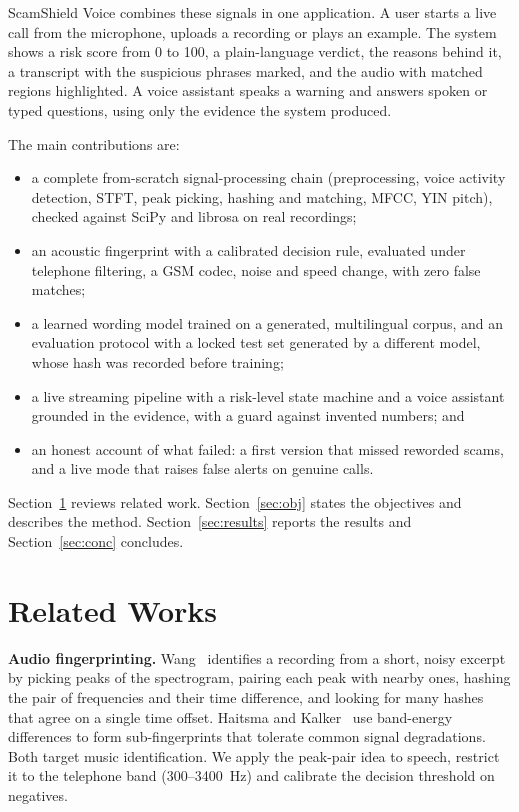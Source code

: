 \documentclass[letterpaper,12pt]{article}
\begin{document}
ScamShield Voice combines these signals in one application. A user starts a live call from the microphone, uploads a recording or plays an example. The system shows a risk score from 0 to 100, a plain-language verdict, the reasons behind it, a transcript with the suspicious phrases marked, and the audio with matched regions highlighted. A voice assistant speaks a warning and answers spoken or typed questions, using only the evidence the system produced.

The main contributions are:
\begin{itemize}
    \item a complete from-scratch signal-processing chain (preprocessing, voice activity detection, STFT, peak picking, hashing and matching, MFCC, YIN pitch), checked against SciPy and librosa on real recordings;
    \item an acoustic fingerprint with a calibrated decision rule, evaluated under telephone filtering, a GSM codec, noise and speed change, with zero false matches;
    \item a learned wording model trained on a generated, multilingual corpus, and an evaluation protocol with a locked test set generated by a different model, whose hash was recorded before training;
    \item a live streaming pipeline with a risk-level state machine and a voice assistant grounded in the evidence, with a guard against invented numbers; and
    \item an honest account of what failed: a first version that missed reworded scams, and a live mode that raises false alerts on genuine calls.
\end{itemize}
Section~\ref{sec:related} reviews related work. Section~\ref{sec:obj} states the objectives and describes the method. Section~\ref{sec:results} reports the results and Section~\ref{sec:conc} concludes.

\section{Related Works}\label{sec:related}
\textbf{Audio fingerprinting.} Wang~\cite{wang2003shazam} identifies a recording from a short, noisy excerpt by picking peaks of the spectrogram, pairing each peak with nearby ones, hashing the pair of frequencies and their time difference, and looking for many hashes that agree on a single time offset. Haitsma and Kalker~\cite{haitsma2002fingerprint} use band-energy differences to form sub-fingerprints that tolerate common signal degradations. Both target music identification. We apply the peak-pair idea to speech, restrict it to the telephone band (300--3400~Hz) and calibrate the decision threshold on negatives.
\end{document}
